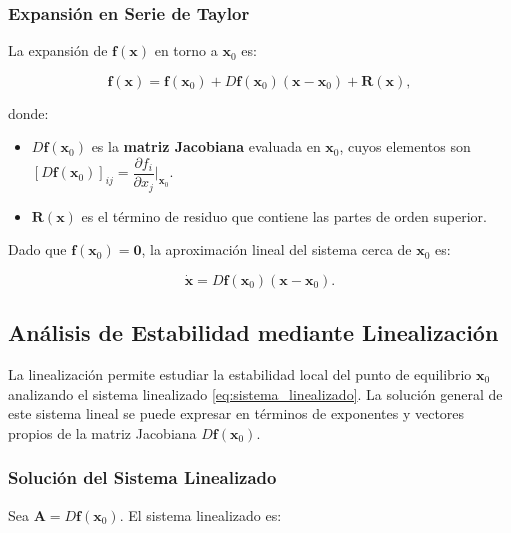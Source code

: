 \subsubsection{Expansión en Serie de Taylor}

La expansión de $\mathbf{f}(\mathbf{x})$ en torno a $\mathbf{x}_0$ es:

\begin{equation}
    \mathbf{f}(\mathbf{x}) = \mathbf{f}(\mathbf{x}_0) + D\mathbf{f}(\mathbf{x}_0)(\mathbf{x} - \mathbf{x}_0) + \mathbf{R}(\mathbf{x}),
\end{equation}

donde:

\begin{itemize}
    \item $D\mathbf{f}(\mathbf{x}_0)$ es la \textbf{matriz Jacobiana} evaluada en $\mathbf{x}_0$, cuyos elementos son $\left[ D\mathbf{f}(\mathbf{x}_0) \right]_{ij} = \dfrac{\partial f_i}{\partial x_j} \bigg|_{\mathbf{x}_0}$.
    \item $\mathbf{R}(\mathbf{x})$ es el término de residuo que contiene las partes de orden superior.
\end{itemize}

Dado que $\mathbf{f}(\mathbf{x}_0) = \mathbf{0}$, la aproximación lineal del sistema cerca de $\mathbf{x}_0$ es:

\begin{equation}\label{eq:sistema_linealizado}
    \dot{\mathbf{x}} = D\mathbf{f}(\mathbf{x}_0)(\mathbf{x} - \mathbf{x}_0).
\end{equation}

\subsection{Análisis de Estabilidad mediante Linealización}

La linealización permite estudiar la estabilidad local del punto de equilibrio $\mathbf{x}_0$ analizando el sistema linealizado \eqref{eq:sistema_linealizado}. La solución general de este sistema lineal se puede expresar en términos de exponentes y vectores propios de la matriz Jacobiana $D\mathbf{f}(\mathbf{x}_0)$.

\subsubsection{Solución del Sistema Linealizado}

Sea $\mathbf{A} = D\mathbf{f}(\mathbf{x}_0)$. El sistema linealizado es:

